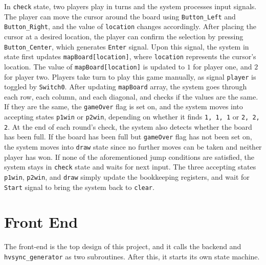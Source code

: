 \documentclass[UTF8,12pt,letterpaper,oneside]{amsart}
\begin{document}
In \texttt{check} state, two players play in turns and the system processes input signals. The player can move the cursor around the board using \texttt{Button\_Left} and \texttt{Button\_Right}, and the value of \texttt{location} changes accordingly. After placing the cursor at a desired location, the player can confirm the selection by pressing \texttt{Button\_Center}, which generates \texttt{Enter} signal. Upon this signal, the system in  state first updates \texttt{mapBoard[location]}, where \texttt{location} represents the cursor's location. The value of \texttt{mapBoard[location]} is updated to $1$ for player one, and $2$ for player two. Players take turn to play this game manually, as signal \texttt{player} is toggled by \texttt{Switch0}. After updating \texttt{mapBoard} array, the system goes through each row, each column, and each diagonal, and checks if the values are the same. If they are the same, the \texttt{gameOver} flag is set on, and the system moves into accepting states \texttt{p1win} or \texttt{p2win}, depending on whether it finds \texttt{1, 1, 1} or \texttt{2, 2, 2}. At the end of each round's check, the system also detects whether the board has been full. If the board has been full but \texttt{gameOver} flag has not been set on, the system moves into \texttt{draw} state since no further moves can be taken and neither player has won. If none of the aforementioned jump conditions are satisfied, the system stays in \texttt{check} state and waits for next input. The three accepting states \texttt{p1win}, \texttt{p2win}, and \texttt{draw} simply update the bookkeeping registers, and wait for \texttt{Start} signal to bring the system back to \texttt{clear}.

\section{Front End}

The front-end is the top design of this project, and it calls the backend and \texttt{hvsync\_generator} as two subroutines. After this, it starts its own state machine.
\end{document}
